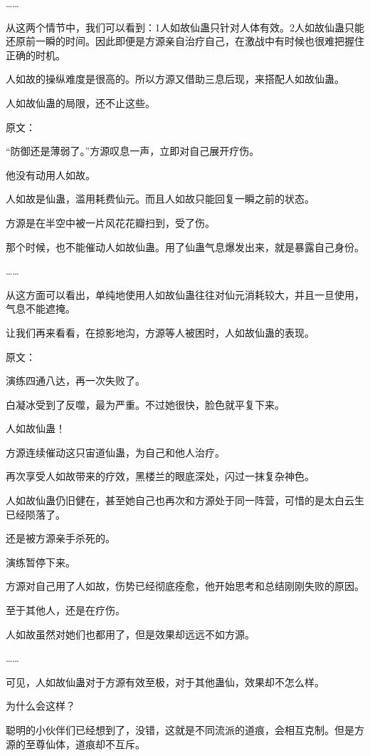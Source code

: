 \begin{this_body}
……

从这两个情节中，我们可以看到：1人如故仙蛊只针对人体有效。2人如故仙蛊只能还原前一瞬的时间。因此即便是方源亲自治疗自己，在激战中有时候也很难把握住正确的时机。

人如故的操纵难度是很高的。所以方源又借助三息后现，来搭配人如故仙蛊。

人如故仙蛊的局限，还不止这些。

原文：

“防御还是薄弱了。”方源叹息一声，立即对自己展开疗伤。

他没有动用人如故。

人如故是仙蛊，滥用耗费仙元。而且人如故只能回复一瞬之前的状态。

方源是在半空中被一片风花花瓣扫到，受了伤。

那个时候，也不能催动人如故仙蛊。用了仙蛊气息爆发出来，就是暴露自己身份。

……

从这方面可以看出，单纯地使用人如故仙蛊往往对仙元消耗较大，并且一旦使用，气息不能遮掩。

让我们再来看看，在掠影地沟，方源等人被困时，人如故仙蛊的表现。

原文：

演练四通八达，再一次失败了。

白凝冰受到了反噬，最为严重。不过她很快，脸色就平复下来。

人如故仙蛊！

方源连续催动这只宙道仙蛊，为自己和他人治疗。

再次享受人如故带来的疗效，黑楼兰的眼底深处，闪过一抹复杂神色。

人如故仙蛊仍旧健在，甚至她自己也再次和方源处于同一阵营，可惜的是太白云生已经陨落了。

还是被方源亲手杀死的。

演练暂停下来。

方源对自己用了人如故，伤势已经彻底痊愈，他开始思考和总结刚刚失败的原因。

至于其他人，还是在疗伤。

人如故虽然对她们也都用了，但是效果却远远不如方源。

……

可见，人如故仙蛊对于方源有效至极，对于其他蛊仙，效果却不怎么样。

为什么会这样？

聪明的小伙伴们已经想到了，没错，这就是不同流派的道痕，会相互克制。但是方源的至尊仙体，道痕却不互斥。


\end{this_body}

